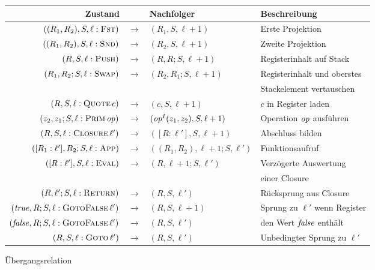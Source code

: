\documentclass[12pt,fleqn]{article}
\begin{document}
\begin{figure}
  {\footnotesize
  \begin{center}
    \begin{tabular}{|rcl|l|}
      \hline
      Zustand \hfill \quad && Nachfolger & Beschreibung \\
      \hline
      $((R_1,R_2),S,\ell:\textsc{Fst})$ & $\to$ & $(R_1,S,\ell+1)$ & Erste Projektion \\
      $((R_1,R_2),S,\ell:\textsc{Snd})$ & $\to$ & $(R_2,S,\ell+1)$ & Zweite Projektion \\
      \hline
      $(R,S,\ell:\textsc{Push})$ & $\to$ & $(R,R;S,\ell+1)$ & Registerinhalt auf Stack \\
      $(R_1,R_2;S,\ell:\textsc{Swap})$ & $\to$ & $(R_2,R_1;S,\ell+1)$ & Registerinhalt und oberstes \\
      &&& Stackelement vertauschen \\
      \hline
      $(R,S,\ell:\textsc{Quote}\,c)$ & $\to$ & $(c,S,\ell+1)$ & $c$ in Register laden \\
      $(z_2,z_1;S,\ell:\textsc{Prim}\,{\text{\it op\/}})$ & $\to$ & $({\text{\it op\/}}^I(z_1,z_2),S,\ell+1)$ & Operation ${\text{\it op\/}}$ ausf\"uhren \\
      $(R,S,\ell:\textsc{Closure}\,\ell')$ & $\to$ & $([R:\ell'],S,\ell+1)$ & Abschluss bilden \\
      \hline
      $([R_1:\ell'],R_2;S,\ell:\textsc{App})$ & $\to$ & $((R_1,R_2),\ell+1;S,\ell')$ & Funktionsaufruf \\
      $([R:\ell'],S,\ell:\textsc{Eval})$ & $\to$ & $(R,\ell+1;S,\ell')$ & Verz\"ogerte Auswertung \\
      &&& einer Closure \\
      $(R,\ell';S,\ell:\textsc{Return})$ & $\to$ & $(R,S,\ell')$ & R\"ucksprung aus Closure \\
      $({\text{\it true\/}},R;S,\ell:\textsc{GotoFalse}\,\ell')$ & $\to$ & $(R,S,\ell+1)$ & Sprung zu $\ell'$ wenn Register \\
      $({\text{\it false\/}},R;S,\ell:\textsc{GotoFalse}\,\ell')$ & $\to$ & $(R,S,\ell')$ & den Wert ${\text{\it false\/}}$ enth\"alt \\
      $(R,S,\ell:\textsc{Goto}\,\ell')$ & $\to$ & $(R,S,\ell')$ & Unbedingter Sprung zu $\ell'$ \\
      \hline
    \end{tabular}
  \end{center}}
  \caption{\"Ubergangsrelation}
  \label{table:CAM_Transitions}
\end{figure}
\end{document}
